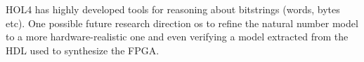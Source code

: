 \documentclass{llncs}
\begin{document}
HOL4 has highly developed tools  for reasoning about bitstrings (words, bytes etc).
One possible future research direction os to refine the natural number model to a more hardware-realistic one and even verifying a model extracted from the HDL used to synthesize the FPGA.












\end{document}
